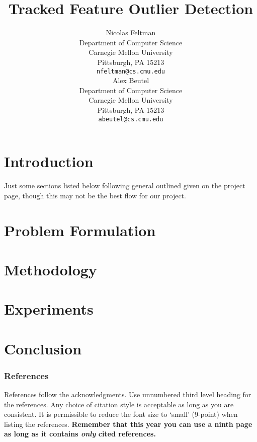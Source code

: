 \documentclass{article} %
\title{Tracked Feature Outlier Detection}
\author{
Nicolas Feltman\\
Department of Computer Science\\
Carnegie Mellon University\\
Pittsburgh, PA 15213 \\
\texttt{nfeltman@cs.cmu.edu} \\
\And
Alex Beutel\\
Department of Computer Science\\
Carnegie Mellon University\\
Pittsburgh, PA 15213 \\
\texttt{abeutel@cs.cmu.edu} 
}
\begin{document}
\maketitle

\begin{abstract}

\end{abstract}


\section{Introduction} %
\label{sec:Introduction}
Just some sections listed below following general outlined given on the project
page, though this may not be the best flow for our project.

\section{Problem Formulation} %
\label{sec:Problem Formulation}


\section{Methodology} %
\label{sec:Methodology}


\section{Experiments} %
\label{sec:Experiments}


\section{Conclusion} %
\label{sec:Conclusion}




\subsubsection*{References}

References follow the acknowledgments. Use unnumbered third level heading for
the references. Any choice of citation style is acceptable as long as you are
consistent. It is permissible to reduce the font size to `small' (9-point) 
when listing the references. {\bf Remember that this year you can use
a ninth page as long as it contains \emph{only} cited references.}
\end{document}
